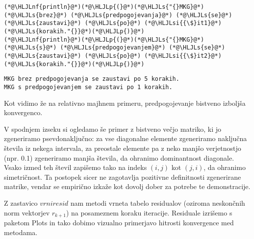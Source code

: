 \documentclass[12pt,a4paper]{article}
\newcommand{\HLJLnf}[1]{\textcolor[RGB]{66,102,213}{#1}}
\newcommand{\HLJLs}[1]{\textcolor[RGB]{201,61,57}{#1}}
\newcommand{\HLJLsi}[1]{#1}
\newcommand{\HLJLp}[1]{#1}
\begin{document}
\begin{lstlisting}
(*@\HLJLnf{println}@*)(*@\HLJLp{(}@*)(*@\HLJLs{"{}MKG}@*) (*@\HLJLs{brez}@*) (*@\HLJLs{predpogojevanja}@*) (*@\HLJLs{se}@*) (*@\HLJLs{zaustavi}@*) (*@\HLJLs{po}@*) (*@\HLJLsi{{\$}it1}@*) (*@\HLJLs{korakih."{}}@*)(*@\HLJLp{)}@*)
(*@\HLJLnf{println}@*)(*@\HLJLp{(}@*)(*@\HLJLs{"{}MKG}@*) (*@\HLJLs{s}@*) (*@\HLJLs{predpogojevanjem}@*) (*@\HLJLs{se}@*) (*@\HLJLs{zaustavi}@*) (*@\HLJLs{po}@*) (*@\HLJLsi{{\$}it2}@*) (*@\HLJLs{korakih."{}}@*)(*@\HLJLp{)}@*)
\end{lstlisting}

\begin{lstlisting}
MKG brez predpogojevanja se zaustavi po 5 korakih.
MKG s predpogojevanjem se zaustavi po 1 korakih.
\end{lstlisting}


Kot vidimo že na relativno majhnem primeru, predpogojevanje bistveno izboljša konvergenco.


V spodnjem izseku si ogledamo še primer z bistveno večjo matriko, ki jo zgeneriramo psevdonaključno: za vse diagonalne elemente zgeneriramo naključna števila iz nekega intervala, za preostale elemente pa  z neko manjšo verjetnostjo (npr. 0.1) zgeneriramo manjša števila, da ohranimo dominantnost diagonale. Vsako izmed teh števil zapišemo tako na indeks $(i,j)$ kot $(j,i)$, da ohranimo simetričnost. Ta postopek sicer ne zagotavlja pozitivne definitnosti zgenerirane matrike, vendar se empirično izkaže kot dovolj dober za potrebe te demonstracije.


Z zastavico $\textit{vrniresid}$ nam metodi vrneta tabelo residualov (oziroma neskončnih norm vektorjev $r_{k+1}$) na posameznem koraku iteracije. Residuale izrišemo s paketom Plots in tako dobimo vizualno primerjavo hitrosti konvergence med metodama. 
\end{document}
